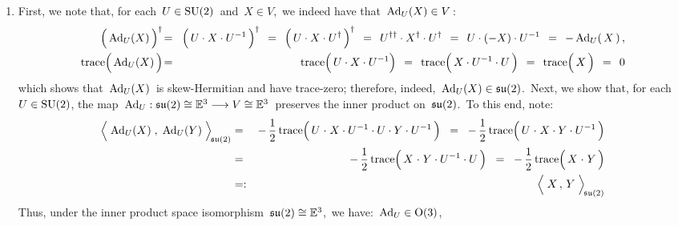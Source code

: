 \begin{enumerate}
\item
	First, we note that, for each \,$U \in \textnormal{SU}(2)$\, and \,$X \in V$,\,
	we indeed have that \,$\textnormal{Ad}_{U}(X) \in V$\,:
	\begin{eqnarray*}
	\left(\,\textnormal{Ad}_{U}(\overset{{\color{white}.}}{X})\,\right)^{\dagger}
	& \!=\! &
		\left(\, U \cdot \overset{{\color{white}.}}{X} \cdot U^{-1} \,\right)^{\dagger}
	\;\, = \;\,
		\left(\, U \cdot \overset{{\color{white}.}}{X} \cdot U^{\dagger} \,\right)^{\dagger}
	\;\, = \;\,
		U^{\dagger\dagger} \cdot X^{\dagger} \cdot U^{\dagger}
	\;\, = \;\,
		U \cdot (-X) \cdot U^{-1}
	\;\, = \;\,
		- \, \textnormal{Ad}_{U}(\,X\,)\,,
	\\
	\trace\!\left(\,\textnormal{Ad}_{U}(\overset{{\color{white}.}}{X})\,\right)
	& \!=\! &
		\trace\!\left(\, U \cdot \overset{{\color{white}.}}{X} \cdot U^{-1}\right)
	\;\, = \;\,
		\trace\!\left(\, \overset{{\color{white}.}}{X} \cdot U^{-1} \cdot U \,\right)
	\;\, = \;\,
		\trace\!\left(\, \overset{{\color{white}.}}{X} \,\right)
	\;\, = \;\,
		0
	\end{eqnarray*}
	which shows that \,$\textnormal{Ad}_{U}(X)$\, is skew-Hermitian and have trace-zero;
	therefore, indeed, \,$\textnormal{Ad}_{U}(X) \in \mathfrak{su}(2)$.\,
	Next, we show that, for each \,$U \in \textnormal{SU}(2)$, the map
	\,$\textnormal{Ad}_{U} : \mathfrak{su}(2) \cong \mathbb{E}^{3}\longrightarrow V \cong \mathbb{E}^{3}$\,
	preserves the inner product on \,$\mathfrak{su}(2)$.\,
	To this end, note:
	\begin{eqnarray*}
		\left\langle\;
		\textnormal{Ad}_{U}(\overset{{\color{white}.}}{X})
		\; , \;
		\textnormal{Ad}_{U}(Y)
		\;\right\rangle_{\!\su(2)}
	& = &
		-\,\dfrac{1}{2}\,
		\trace\!\left(\,
				U \overset{{\color{white}1}}{\cdot} X \cdot U^{-1} \cdot U \cdot Y \cdot U^{-1}
			\,\right)
	\;\; = \;\;
		-\,\dfrac{1}{2}\,
		\trace\!\left(\,
			U \overset{{\color{white}1}}{\cdot} X \cdot Y \cdot U^{-1}
			\,\right)
	\\
	& = &
		-\,\dfrac{1}{2}\,
		\trace\!\left(\,
			X \overset{{\color{white}1}}{\cdot} Y \cdot U^{-1} \cdot U
			\,\right)
	\;\; = \;\;
		-\,\dfrac{1}{2}\,
		\trace\!\left(\,
			X \overset{{\color{white}1}}{\cdot} Y
			\,\right)
	\\
	& =: &
		\left\langle\;
			\overset{{\color{white}.}}{X}
			\, , \,
			Y
			\;\right\rangle_{\!\su(2)}
	\end{eqnarray*}
	Thus, under the inner product space isomorphism
	\,$\mathfrak{su}(2) \cong \mathbb{E}^{3}$,\,
	we have:
	\,$\textnormal{Ad}_{U} \in \textnormal{O}(3)$,\,

\end{enumerate}
